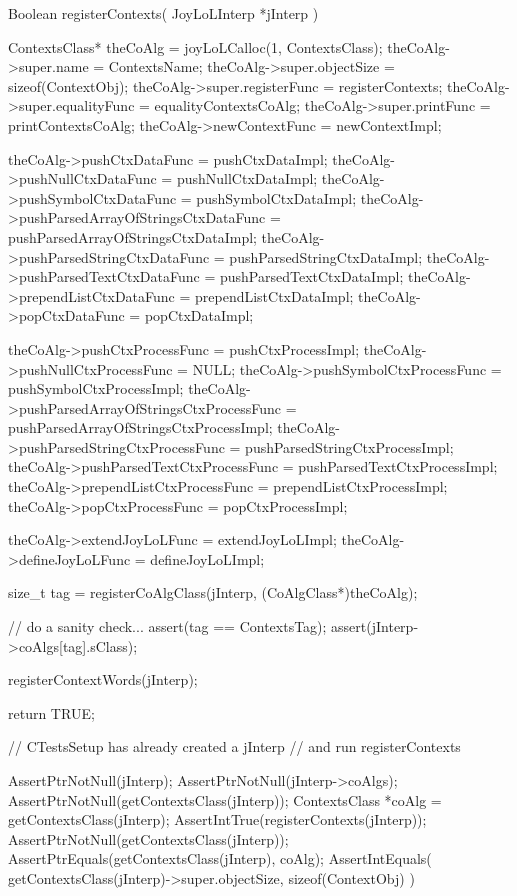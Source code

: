 \startCCode
Boolean registerContexts(
  JoyLoLInterp *jInterp
) {
  ContextsClass* theCoAlg    = 
    joyLoLCalloc(1, ContextsClass);
  theCoAlg->super.name             = ContextsName;
  theCoAlg->super.objectSize       = sizeof(ContextObj);
  theCoAlg->super.registerFunc     = registerContexts;
  theCoAlg->super.equalityFunc     = equalityContextsCoAlg;
  theCoAlg->super.printFunc        = printContextsCoAlg;
  theCoAlg->newContextFunc         = newContextImpl;
  
  theCoAlg->pushCtxDataFunc        = pushCtxDataImpl;
  theCoAlg->pushNullCtxDataFunc    = pushNullCtxDataImpl;
  theCoAlg->pushSymbolCtxDataFunc  = pushSymbolCtxDataImpl;
  theCoAlg->pushParsedArrayOfStringsCtxDataFunc =
    pushParsedArrayOfStringsCtxDataImpl;
  theCoAlg->pushParsedStringCtxDataFunc =
    pushParsedStringCtxDataImpl;
  theCoAlg->pushParsedTextCtxDataFunc =
    pushParsedTextCtxDataImpl;
  theCoAlg->prependListCtxDataFunc = prependListCtxDataImpl;
  theCoAlg->popCtxDataFunc         = popCtxDataImpl;
  
  theCoAlg->pushCtxProcessFunc     = pushCtxProcessImpl;
  theCoAlg->pushNullCtxProcessFunc = NULL;
  theCoAlg->pushSymbolCtxProcessFunc =
    pushSymbolCtxProcessImpl;
  theCoAlg->pushParsedArrayOfStringsCtxProcessFunc =
    pushParsedArrayOfStringsCtxProcessImpl;
  theCoAlg->pushParsedStringCtxProcessFunc =
    pushParsedStringCtxProcessImpl;
  theCoAlg->pushParsedTextCtxProcessFunc =
    pushParsedTextCtxProcessImpl;
  theCoAlg->prependListCtxProcessFunc =
    prependListCtxProcessImpl;
  theCoAlg->popCtxProcessFunc      = popCtxProcessImpl;
  
  theCoAlg->extendJoyLoLFunc       = extendJoyLoLImpl;
  theCoAlg->defineJoyLoLFunc       = defineJoyLoLImpl;
  
  size_t tag =
    registerCoAlgClass(jInterp, (CoAlgClass*)theCoAlg);

  // do a sanity check...
  assert(tag == ContextsTag);
  assert(jInterp->coAlgs[tag].sClass);
  
  registerContextWords(jInterp);
  
  return TRUE;
}
\stopCCode


\startCTest
  // CTestsSetup has already created a jInterp
  // and run registerContexts
  
  AssertPtrNotNull(jInterp);
  AssertPtrNotNull(jInterp->coAlgs);
  AssertPtrNotNull(getContextsClass(jInterp));
  ContextsClass *coAlg = getContextsClass(jInterp);
  AssertIntTrue(registerContexts(jInterp));
  AssertPtrNotNull(getContextsClass(jInterp));
  AssertPtrEquals(getContextsClass(jInterp), coAlg);
  AssertIntEquals(
    getContextsClass(jInterp)->super.objectSize,
    sizeof(ContextObj)
  )
\stopCTest


